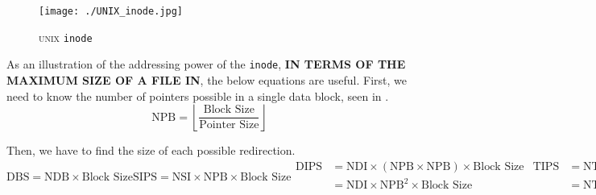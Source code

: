 \begin{figure}[h!tbp]
  \centering
  \texttt{[image: ./UNIX\_inode.jpg]}
  \caption{\textsc{unix} \texttt{inode}}
  \label{fig:Inode}
\end{figure}

As an illustration of the addressing power of the \texttt{inode}, \textbf{IN TERMS OF THE MAXIMUM SIZE OF A FILE IN}, the below equations are useful.
First, we need to know the number of pointers possible in a single data block, seen in .
\begin{equation}\label{eq:Inode_Num_Pointers}
  \mathrm{NPB} = \left\lfloor \frac{\text{Block Size}}{\text{Pointer Size}} \right\rfloor
\end{equation}

Then, we have to find the size of each possible redirection.
\begin{subequations}\label{eq:Indirect_Pointer_Sizes}
  \begin{equation}\label{subeq:Direct_Pointer_Size}
    \mathrm{DBS} = \mathrm{NDB} \times \text{Block Size}
  \end{equation}
  \begin{equation}\label{subeq:Single_Indirect_Pointer_Size}
    \mathrm{SIPS} = \mathrm{NSI} \times \mathrm{NPB} \times \text{Block Size}
  \end{equation}
  \begin{equation}\label{subeq:Double_Indirect_Pointer_Size}
    \begin{aligned}
      \mathrm{DIPS} &= \mathrm{NDI} \times (\mathrm{NPB} \times \mathrm{NPB}) \times \text{Block Size} \\
      &= \mathrm{NDI} \times {\mathrm{NPB}}^{2} \times \text{Block Size} \\
    \end{aligned}
  \end{equation}
  \begin{equation}\label{subeq:Triple_Indirect_Pointer_Size}
    \begin{aligned}
      \mathrm{TIPS} &= \mathrm{NTI} \times (\mathrm{NPB} \times \mathrm{NPB} \times \mathrm{NPB}) \times \text{Block Size} \\
      &= \mathrm{NTI} \times {\mathrm{NPB}}^{3} \times \text{Block Size} \\
    \end{aligned}
  \end{equation}
\end{subequations}

